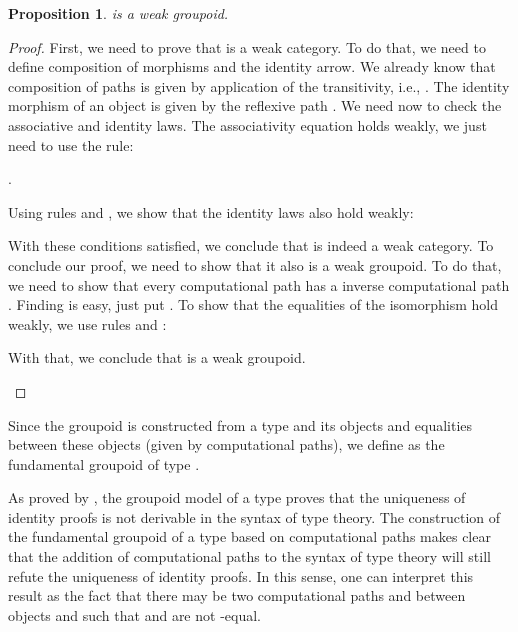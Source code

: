 \documentclass[12pt, a4paper,  oneside, headinclude,footinclude, BCOR5mm]{scrartcl}
\newtheorem{proposition}{Proposition}[section]
\begin{document}
\begin{proposition}
 is a weak groupoid.
\end{proposition}

\begin{proof}

First, we need to prove that  is a weak category. To do that, we need to define composition of morphisms and the identity arrow. We already know that composition of paths  is given by application of the transitivity, i.e., . The identity morphism of an object  is given by the reflexive path . We need now to check the associative and identity laws. The associativity equation holds weakly, we just need to use the  rule:

\begin{center}
.
\end{center}

Using rules  and , we show that the identity laws also hold weakly:

\begin{center}




\end{center}

With these conditions satisfied, we conclude that  is indeed a weak category. To conclude our proof, we need to show that it also is a weak groupoid. To do that, we need to show that every computational path  has a inverse computational path . Finding  is easy, just put . To show that the equalities of the isomorphism hold weakly, we use rules  and :

\begin{center}





With that, we conclude that  is a weak groupoid.

\end{center}
\end{proof}

Since the groupoid  is constructed from a type  and its objects and equalities between these objects (given by computational paths), we define  as the fundamental groupoid of type .

As proved by \cite{Streicher2}, the groupoid model of a type proves that the uniqueness of identity proofs is not derivable in the syntax of type theory. The construction of the fundamental groupoid of a type based on computational paths makes clear that the addition of computational paths to the syntax of type theory will still refute the uniqueness of identity proofs. In this sense, one can interpret this result as the fact that there may be two computational paths  and  between objects  and  such that  and  are not -equal.
\end{document}

